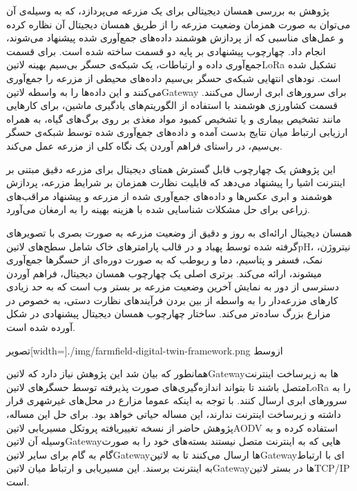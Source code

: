 
پژوهش  به بررسی همسان دیجیتالی برای یک مزرعه می‌پردازد، که به وسیله‌ی آن می‌توان به صورت همزمان وضعیت مزرعه را از طریق
همسان دیجیتال آن نظاره کرده و عمل‌های مناسبی که از پردازش هوشمند داده‌های جمع‌آوری شده پیشنهاد می‌شوند، انجام داد.
چهارچوب پیشنهادی بر پایه دو قسمت ساخته شده است. برای قسمت جمع‌آوری داده و ارتباطات، یک شبکه‌ی حسگر بی‌سیم بهینه ‌لاتین{LoRa} تشکیل شده است.
نودهای انتهایی شبکه‌ی حسگر بی‌سیم داده‌های محیطی از مزرعه را جمع‌آوری می‌کنند و این داده‌ها را به واسطه ‌لاتین{Gateway} برای سرورهای ابری ارسال می‌کنند.
قسمت کشاورزی هوشمند با استفاده از الگوریتم‌های یادگیری ماشین، برای کارهایی مانند تشخیص بیماری و یا تشخیص کمبود مواد مغذی بر روی برگ‌های گیاه،
به همراه ارزیابی ارتباط میان نتایج بدست آمده و داده‌های جمع‌آوری شده توسط شبکه‌ی حسگر بی‌سیم، در راستای فراهم آوردن یک نگاه کلی از مزرعه عمل می‌کند.

این پژوهش یک چهارچوب قابل گسترش همتای دیجیتال برای مزرعه دقیق مبتنی بر اینترنت اشیا را پیشنهاد می‌دهد که قابلیت نظارت همزمان بر شرایط مزرعه،
پردازش هوشمند و ابری عکس‌ها و داده‌های جمع‌آوری شده از مزرعه و پیشنهاد مراقب‌های زراعی برای حل مشکلات شناسایی شده با هزینه بهینه را به ارمغان
می‌آورد.

همسان دیجیتال ارائه‌‌ای به روز و دقیق از وضعیت مزرعه به صورت بصری با تصویرهای گرفته شده توسط پهباد و در قالب پارامترهای خاک شامل سطح‌های ‌لاتین{pH}،
نیتروژن، نمک، فسفر و پتاسیم، دما و ربوطب که به صورت دوره‌ای از حسگرها جمع‌آوری میشوند، ارائه می‌کند.
برتری اصلی یک چهارچوب همسان دیجیتال، فراهم آوردن دسترسی از دور به نمایش آخرین وضعیت مزرعه بر بستر وب است که به حد زیادی کارهای مزرعه‌دار را
به واسطه از بین بردن فرآیندهای نظارت دستی، به خصوص در مزارع بزرگ ساده‌تر می‌کند.
ساختار چهارچوب همسان دیجیتال پیشنهادی در شکل  آورده شده است.

‌تصویر[width=\textwidth]{./img/farmfield-digital-twin-framework.png}
‌ازوسط

همانطور که بیان شد این پژوهش نیاز دارد که ‌لاتین{Gateway}ها به زیرساخت اینترنت متصل باشند تا بتواند اندازه‌گیری‌های صورت پذیرفته توسط حسگرهای ‌لاتین{LoRa} را
به سرورهای ابری ارسال کنند. با توجه به اینکه عموما مزارع در محل‌های غیرشهری قرار داشته و زیرساخت اینترنت ندارند، این مساله حیاتی خواهد بود.
برای حل این مساله، پژوهش حاضر از نسخه تغییریافته پروتکل مسیریابی ‌لاتین{AODV} استفاده کرده و به وسیله آن ‌لاتین{Gateway}هایی که به اینترنت متصل نیستند بسته‌های خود
را به صورت گام به گام برای سایر ‌لاتین{Gateway}ها ارسال می‌کنند تا به ‌لاتین{Gateway}ای با ارتباط به اینترنت برسند.
این مسیریابی و ارتباط میان ‌لاتین{Gateway}ها در بستر ‌لاتین{TCP/IP} است.

